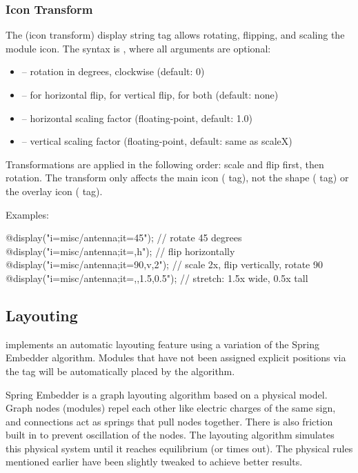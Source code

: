 \subsubsection{Icon Transform}
\label{sec:graphics:icon-transform}

The  (icon transform) display string tag allows rotating, flipping,
and scaling the module icon. The syntax is
, where all arguments are optional:

\begin{itemize}
  \item {} -- rotation in degrees, clockwise (default: 0)
  \item {} --  for horizontal flip,  for vertical flip,
     for both (default: none)
  \item {} -- horizontal scaling factor (floating-point, default: 1.0)
  \item {} -- vertical scaling factor (floating-point, default: same as scaleX)
\end{itemize}

Transformations are applied in the following order: scale and flip first, then
rotation. The transform only affects the main icon ( tag), not the
shape ( tag) or the overlay icon ( tag).

Examples:

\begin{ned}
@display("i=misc/antenna;it=45");       // rotate 45 degrees
@display("i=misc/antenna;it=,h");       // flip horizontally
@display("i=misc/antenna;it=90,v,2");   // scale 2x, flip vertically, rotate 90
@display("i=misc/antenna;it=,,1.5,0.5"); // stretch: 1.5x wide, 0.5x tall
\end{ned}

\subsection{Layouting}
\label{sec:graphics:compound-module-layouting}

{\opp} implements an automatic layouting feature using a variation of the Spring
Embedder algorithm. Modules that have not been assigned explicit positions via
the  tag will be automatically placed by the algorithm.

Spring Embedder is a graph layouting algorithm based on a physical model. Graph
nodes (modules) repel each other like electric charges of the same sign, and
connections act as springs that pull nodes together. There is also friction
built in to prevent oscillation of the nodes. The layouting algorithm simulates
this physical system until it reaches equilibrium (or times out). The physical
rules mentioned earlier have been slightly tweaked to achieve better results.

